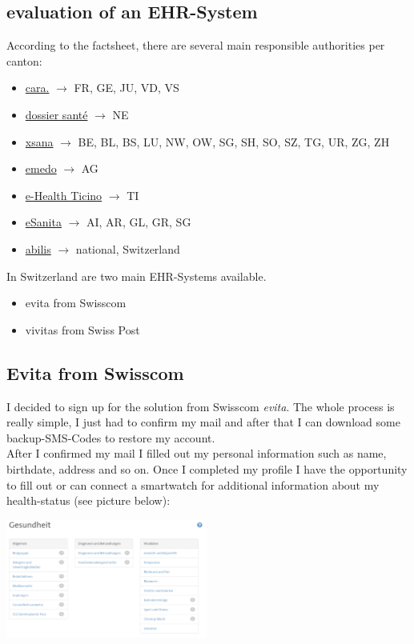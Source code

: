 \documentclass{report}
\newenvironment{Figure}
	{\par\medskip\noindent\minipage{\linewidth}}
	{\endminipage\par\medskip}
\begin{document}
\subsection*{evaluation of an EHR-System}
According to the factsheet, there are several main responsible authorities per canton:
\begin{itemize}
   \item \href{https://www.cara.ch/}{cara.} $\rightarrow$ FR, GE, JU, VD, VS
   \item \href{https://hesav.ch/dossier-sante/}{dossier santé} $\rightarrow$ NE
   \item \href{https://www.xsana.ch/bevoelkerung#benefits}{xsana} $\rightarrow$ BE, BL, BS, LU, NW, OW, SG, SH, SO, SZ, TG, UR, ZG, ZH
   \item \href{https://www.mein-emedo.ch/}{emedo} $\rightarrow$ AG 
   \item \href{https://www.ehti.ch/}{e-Health Ticino} $\rightarrow$ TI
   \item \href{https://esanita.ch/}{eSanita} $\rightarrow$ AI, AR, GL, GR, SG
   \item \href{https://www.abilis.ch/de}{abilis} $\rightarrow$ national, Switzerland
\end{itemize}

In Switzerland are two main EHR-Systems available. 
\begin{itemize}
   \item evita from Swisscom
   \item vivitas from Swiss Post
\end{itemize}

\subsection*{Evita from Swisscom}
I decided to sign up for the solution from Swisscom \textit{evita}. The whole process is really simple, I just had to confirm my mail and after that I can download some backup-SMS-Codes to restore my account.\\
After I confirmed my mail I filled out my personal information such as name, birthdate, address and so on. Once I completed my profile I have the opportunity to fill out or can connect a smartwatch for additional information about my health-status (see picture below):
\begin{Figure}
   \centering
    \includegraphics[width=250px]{img/Gesundheit.png}
        \label{fig:List of additional information about the health-status}
    \end{Figure}
\end{document}
